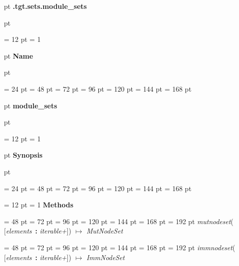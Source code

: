 {\par \pagebreak[3]  pt \noindent
{\LARGE {\bf .tgt.sets.module{\_}sets\/}}\par {} pt
} \noindent
{\par \noindent
{\par \pagebreak[3.300000] \noindent \hangindent = 12 pt \hangafter = 1 
{\par \pagebreak[3]  pt \noindent
{\Large {\bf Name\/}}\par {} pt
} \noindent
\par}
{\par \noindent  \leftskip = 24 pt  \leftmargini = 48 pt  \leftmarginii = 72 pt  \leftmarginiii = 96 pt  \leftmarginiv = 120 pt  \leftmarginv = 144 pt  \leftmarginvi = 168 pt {\par \pagebreak[3]  pt \noindent
{\Large {\bf module{\_}sets\/}}\par {} pt
} \noindent
\par}
{\par \pagebreak[3.300000] \noindent \hangindent = 12 pt \hangafter = 1 
{\par \pagebreak[3]  pt \noindent
{\Large {\bf Synopsis\/}}\par {} pt
} \noindent
\par}
{\par \noindent  \leftskip = 24 pt  \leftmargini = 48 pt  \leftmarginii = 72 pt  \leftmarginiii = 96 pt  \leftmarginiv = 120 pt  \leftmarginv = 144 pt  \leftmarginvi = 168 pt {\par \noindent
{\par \pagebreak[3.200000] \noindent \hangindent = 12 pt \hangafter = 1 
{\bf {\large {\bf Methods\/}}\/}\par}
{\par \noindent  \leftskip = 48 pt  \leftmargini = 72 pt  \leftmarginii = 96 pt  \leftmarginiii = 120 pt  \leftmarginiv = 144 pt  \leftmarginv = 168 pt  \leftmarginvi = 192 pt {\large  {\em mutnodeset\/}}( {[}{\em elements\/}~{\bf :}  {\em iterable+\/}]) \(\mapsto \)  {\em MutNodeSet\/}\par}
{\par \noindent  \leftskip = 48 pt  \leftmargini = 72 pt  \leftmarginii = 96 pt  \leftmarginiii = 120 pt  \leftmarginiv = 144 pt  \leftmarginv = 168 pt  \leftmarginvi = 192 pt {\large  {\em immnodeset\/}}( {[}{\em elements\/}~{\bf :}  {\em iterable+\/}]) \(\mapsto \)  {\em ImmNodeSet\/}\par}
\par}
}}
